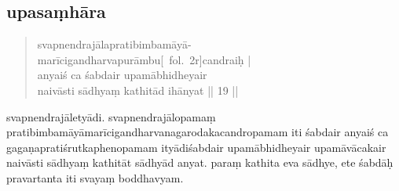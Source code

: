 \documentclass[12pt]{article}
\begin{document}
% 
 
\subsection{upasaṃhāra}
\begin{quote}
	svapnendrajālapratibimbamāyā-\\
	marīcigandharvapurāmbu{[}\MS\ fol.\ 2r{]}candraiḥ |\\
	anyaiś ca śabdair upamābhidheyair \\
	naivāsti sādhyaṃ kathitād ihānyat || 19 ||
% 
\end{quote}

\noindent svapnendrajāletyādi. svapnendrajālopamaṃ pratibimbamāyāmarīcigandharvanagarodakacandropamam iti śabdair anyaiś ca gagaṇapratiśrutkaphenopamam ityādiśabdair upamābhidheyair upamāvācakair naivāsti sādhyaṃ kathitāt sādhyād anyat. paraṃ kathita eva sādhye, ete śabdāḥ pravartanta iti svayaṃ boddhavyam.
\end{document}

